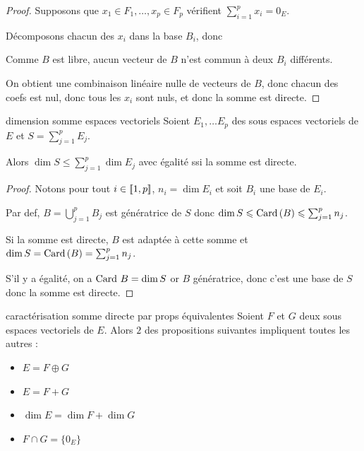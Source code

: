 \begin{proof}
    Supposons que $x_1 \in F_1, \dots, x_p \in F_p$ vérifient $\sum_{i = 1 }^{ p } x_i = 0_E$.

    Décomposons chacun des $x_i$ dans la base $B_i$, donc

    Comme $B$ est libre, aucun vecteur de $B$ n'est commun à deux $B_i$ différents. 

    On obtient une combinaison linéaire nulle de vecteurs de $B$, donc chacun des coefs est nul, 
    donc tous les $x_i$ sont nuls, et donc la somme est directe. 
\end{proof}

\begin{proposition}{dimension somme espaces vectoriels}{}
    Soient $E_1, \dots E_p$ des sous espaces vectoriels de $E$ et $\displaystyle S = \sum_{j=1}^p E_j$.

    Alors $\displaystyle \dim S \leqslant \sum_{j=1}^p \dim E_j$ avec égalité ssi la 
    somme est directe.
\end{proposition}

\begin{proof}
    Notons pour tout $i \in [\![1, p]\!]$, $n_i = \dim E_i$ et soit $B_i$ une base de $E_i$.

    Par def, $B = \bigcup_{j=1}^p B_j$ est génératrice de $S$ donc $\dim S \leqslant \operatorname{Card} \,(B) \leqslant \sum_{j=1}^p n_j$.

    Si la somme est directe, $B$ est adaptée à cette somme et $\dim S = \operatorname{Card} \,(B) = \sum_{j=1}^p n_j$.

    S'il y a égalité, on a $\operatorname{Card} \, B = \dim S$ or $B$ génératrice, donc 
    c'est une base de $S$ donc la somme est directe.
\end{proof}

\begin{propositionnt}{caractérisation somme directe par props équivalentes}{}
    Soient $F$ et $G$ deux sous espaces vectoriels de $E$. Alors $2$ des propositions 
    suivantes impliquent toutes les autres : 
    \begin{itemize}
        \item $E = F \oplus G$
        \item $E = F + G$
        \item $\dim E = \dim F + \dim G$
        \item $F \cap G = \{0_E\}$
    \end{itemize}
\end{propositionnt}

